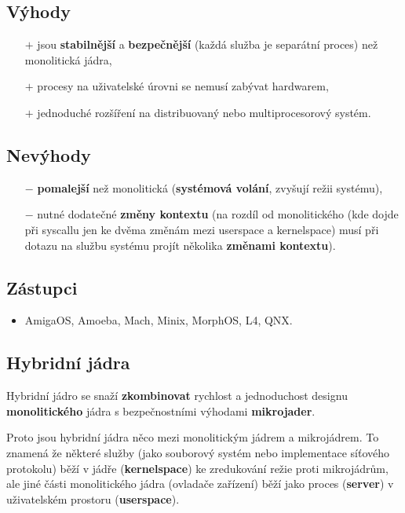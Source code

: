 \subsection*{Výhody}
\begin{itemize}
    \item[$+$] jsou \textbf{stabilnější} a \textbf{bezpečnější} (každá služba je separátní proces) než monolitická jádra,
    \item[$+$] procesy na uživatelské úrovni se nemusí zabývat hardwarem,
    \item[$+$] jednoduché rozšíření na distribuovaný nebo multiprocesorový systém.
\end{itemize}
\subsection*{Nevýhody}
\begin{itemize}
    \item[$-$] \textbf{pomalejší} než monolitická (\textbf{systémová volání}, zvyšují režii systému),
    \item[$-$] nutné dodatečné \textbf{změny kontextu} (na rozdíl od monolitického (kde dojde při syscallu jen ke dvěma změnám mezi userspace a kernelspace) musí při dotazu na službu systému projít několika \textbf{změnami kontextu}).
\end{itemize}
\subsection*{Zástupci}
\begin{itemize}
    \item AmigaOS, Amoeba, Mach, Minix, MorphOS, L4, QNX.
\end{itemize}

\subsection{Hybridní jádra}
Hybridní jádro se snaží \textbf{zkombinovat} rychlost a jednoduchost designu \textbf{monolitického} jádra s bezpečnostními výhodami \textbf{mikrojader}.

Proto jsou hybridní jádra něco mezi monolitickým jádrem a mikrojádrem. To znamená že některé služby (jako souborový systém nebo implementace síťového protokolu) běží v jádře (\textbf{kernelspace}) ke zredukování režie proti mikrojádrům, ale jiné části monolitického jádra (ovladače zařízení) běží jako proces (\textbf{server}) v uživatelském prostoru (\textbf{userspace}).

